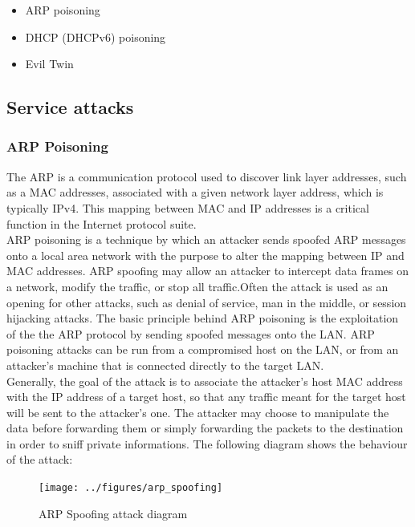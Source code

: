 \documentclass[draft]{article}
\begin{document}
\begin{itemize}
  \item ARP poisoning
  \item DHCP (DHCPv6) poisoning
  \item Evil Twin
\end{itemize}

\subsection{Service attacks}
\subsubsection{ARP Poisoning}
The \ac{ARP} is a communication protocol used to discover link layer addresses,
such as a MAC addresses, associated with a given network layer address, which is typically IPv4.
This mapping between MAC and IP addresses is a critical function in the Internet protocol suite. \\
\ac{ARP} poisoning is a technique by which an attacker sends spoofed \ac{ARP} messages
onto a local area network with the purpose to alter the mapping between IP and MAC addresses.
\ac{ARP} spoofing may allow an attacker to intercept data frames on a network, modify the traffic,
or stop all traffic.Often the attack is used as an opening for other attacks,
such as denial of service, man in the middle, or session hijacking attacks.
The basic principle behind \ac{ARP} poisoning is the exploitation of the the
\ac{ARP} protocol by sending spoofed messages onto the LAN.
\ac{ARP} poisoning attacks can be run from a compromised host on the LAN,
or from an attacker's machine that is connected directly to the target LAN.\\
Generally, the goal of the attack is to associate the attacker's host MAC address
with the IP address of a target host, so that any traffic meant for the target host
will be sent to the attacker's one. The attacker may choose to manipulate the data before
forwarding them or simply  forwarding the packets to the destination in order to sniff private informations.
The following diagram shows the behaviour of the attack:
\begin{figure}[h]
  \center
  \texttt{[image: ../figures/arp\_spoofing]}
  \caption{ARP Spoofing attack diagram}
\end{figure}
\end{document}
